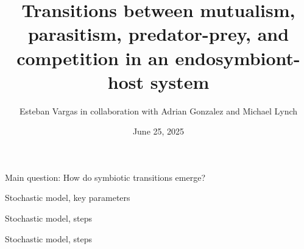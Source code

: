 \documentclass{beamer}
\title{Transitions between mutualism, parasitism, predator-prey, and competition in an endosymbiont-host system}
\author{Esteban Vargas in collaboration with Adrian Gonzalez and Michael Lynch}
\institute{Arizona State University}
\date{June 25, 2025}
\begin{document}
\frame{\titlepage}






\begin{frame}{Main question: How do symbiotic transitions emerge?}



\end{frame}


\begin{frame}{Stochastic model, key parameters}



\end{frame}


\begin{frame}{Stochastic model, steps}



\end{frame}


\begin{frame}{Stochastic model, steps}



\end{frame}


\end{document}
